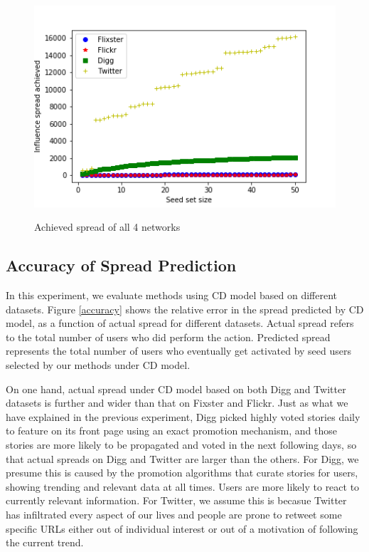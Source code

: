 \documentclass{acm_proc_article-sp}
\begin{document}
\begin{figure}[h]
	\includegraphics[width=\linewidth]{spread4.png}
	\centering
	\label{spreadall}
    \caption{Achieved spread of all 4 networks}
\end{figure}

\subsection*{Accuracy of Spread Prediction}
In this experiment, we evaluate methods using CD model based on different datasets. Figure \ref{accuracy} shows the relative error in the spread predicted by CD model, as a function of actual spread for different datasets. Actual spread refers to the total number of users who did perform the action. Predicted spread represents the total number of users who eventually get activated by seed users selected by our methods under CD model.

On one hand, actual spread under CD model based on both Digg and Twitter datasets is further and wider than that on Fixster and Flickr. Just as what we have explained in the previous experiment, Digg picked highly voted stories daily to feature on its front page using an exact promotion mechanism, and those stories are more likely to be propagated and voted in the next following days, so that actual spreads on Digg and Twitter are larger than the others. For Digg, we presume this is caused by the promotion algorithms that curate stories for users, showing trending and relevant data at all times. Users are more likely to react to currently relevant information. For Twitter, we assume this is becasue Twitter has infiltrated every aspect of our lives and people are prone to retweet some specific URLs either out of individual interest or out of a motivation of following the current trend.
\end{document}
